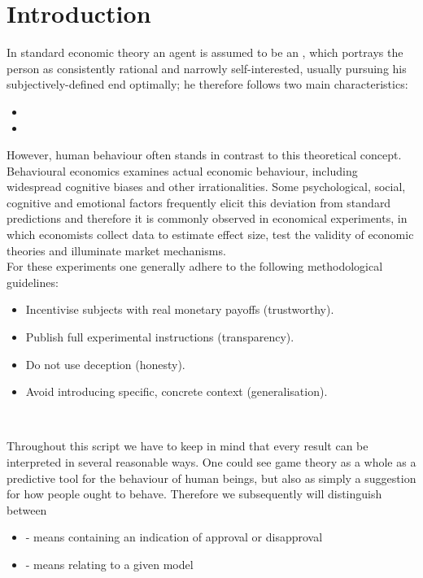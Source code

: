 \chapter*{Introduction} 


In standard economic theory an agent is assumed to be an , which portrays the person as consistently rational and narrowly self-interested, usually pursuing his subjectively-defined end optimally; he therefore follows two main characteristics:
\begin{itemize}
	\item {}
	\item {}
\end{itemize}
However, human behaviour often stands in contrast to this theoretical concept. Behavioural economics examines actual economic behaviour, including widespread cognitive biases and other irrationalities. Some psychological, social, cognitive and emotional factors frequently elicit this deviation from standard predictions and therefore it is commonly observed in economical experiments, in which economists collect data to estimate effect size, test the validity of economic theories and illuminate market mechanisms. \\
For these experiments one generally adhere to the following methodological guidelines:
	\begin{itemize}
		\item Incentivise subjects with real monetary payoffs (trustworthy).
		\item Publish full experimental instructions (transparency).
		\item Do not use deception (honesty).
		\item Avoid introducing specific, concrete context (generalisation).
	\end{itemize}
~	
	
Throughout this script we have to keep in mind that every result can be interpreted in several reasonable ways. One could see game theory as a whole as a predictive tool for the behaviour of human beings, but also as simply a suggestion for how people ought to behave. Therefore we subsequently will distinguish between
\begin{itemize}
	\item {} - means containing an indication of approval or disapproval
	\item {} - means relating to a given model
\end{itemize}